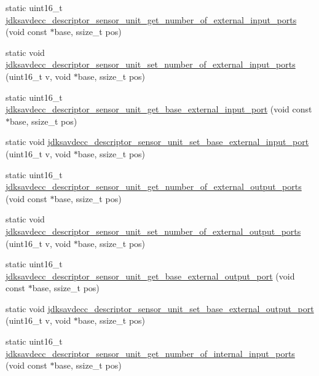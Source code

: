 \begin{DoxyCompactItemize}
\item 
static uint16\+\_\+t \hyperlink{group__descriptor__sensor_gac77654ba9b70284408d511c712a9caa4}{jdksavdecc\+\_\+descriptor\+\_\+sensor\+\_\+unit\+\_\+get\+\_\+number\+\_\+of\+\_\+external\+\_\+input\+\_\+ports} (void const $\ast$base, ssize\+\_\+t pos)
\item 
static void \hyperlink{group__descriptor__sensor_gaa4184097b817ecdeb6f01e89cb39ed5a}{jdksavdecc\+\_\+descriptor\+\_\+sensor\+\_\+unit\+\_\+set\+\_\+number\+\_\+of\+\_\+external\+\_\+input\+\_\+ports} (uint16\+\_\+t v, void $\ast$base, ssize\+\_\+t pos)
\item 
static uint16\+\_\+t \hyperlink{group__descriptor__sensor_ga487635cae4012b028c998e9a8de883aa}{jdksavdecc\+\_\+descriptor\+\_\+sensor\+\_\+unit\+\_\+get\+\_\+base\+\_\+external\+\_\+input\+\_\+port} (void const $\ast$base, ssize\+\_\+t pos)
\item 
static void \hyperlink{group__descriptor__sensor_gab2e0635fe81015ec5329f3fcc031885d}{jdksavdecc\+\_\+descriptor\+\_\+sensor\+\_\+unit\+\_\+set\+\_\+base\+\_\+external\+\_\+input\+\_\+port} (uint16\+\_\+t v, void $\ast$base, ssize\+\_\+t pos)
\item 
static uint16\+\_\+t \hyperlink{group__descriptor__sensor_ga72930266627c681c25b17f2749c8ed05}{jdksavdecc\+\_\+descriptor\+\_\+sensor\+\_\+unit\+\_\+get\+\_\+number\+\_\+of\+\_\+external\+\_\+output\+\_\+ports} (void const $\ast$base, ssize\+\_\+t pos)
\item 
static void \hyperlink{group__descriptor__sensor_ga8038d96df60271119005c2e1a38cd0bf}{jdksavdecc\+\_\+descriptor\+\_\+sensor\+\_\+unit\+\_\+set\+\_\+number\+\_\+of\+\_\+external\+\_\+output\+\_\+ports} (uint16\+\_\+t v, void $\ast$base, ssize\+\_\+t pos)
\item 
static uint16\+\_\+t \hyperlink{group__descriptor__sensor_gab3845adedee2970fbdc68fabd0345b39}{jdksavdecc\+\_\+descriptor\+\_\+sensor\+\_\+unit\+\_\+get\+\_\+base\+\_\+external\+\_\+output\+\_\+port} (void const $\ast$base, ssize\+\_\+t pos)
\item 
static void \hyperlink{group__descriptor__sensor_ga2d015e0ff97fbebb52b21f8fc12a020b}{jdksavdecc\+\_\+descriptor\+\_\+sensor\+\_\+unit\+\_\+set\+\_\+base\+\_\+external\+\_\+output\+\_\+port} (uint16\+\_\+t v, void $\ast$base, ssize\+\_\+t pos)
\item 
static uint16\+\_\+t \hyperlink{group__descriptor__sensor_ga78a8313d3d0cae46b393fb8c9141baa6}{jdksavdecc\+\_\+descriptor\+\_\+sensor\+\_\+unit\+\_\+get\+\_\+number\+\_\+of\+\_\+internal\+\_\+input\+\_\+ports} (void const $\ast$base, ssize\+\_\+t pos)

\end{DoxyCompactItemize}
